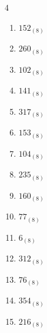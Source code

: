 \begin{multicols}{4}
\begin{enumerate}
        \phantom{$=206$}

  \item $152_{(8)}$

        \phantom{$=106$}

  \item $260_{(8)}$

        \phantom{$=176$}

  \item $102_{(8)}$

        \phantom{$=66$}

  \item $141_{(8)}$

        \phantom{$=97$}

  \item $317_{(8)}$

        \phantom{$=207$}

  \item $153_{(8)}$

        \phantom{$=107$}

  \item $104_{(8)}$

        \phantom{$=68$}

  \item $235_{(8)}$

        \phantom{$=157$}

  \item $160_{(8)}$

        \phantom{$=112$}

  \item $77_{(8)}$

        \phantom{$=63$}

  \item $6_{(8)}$

        \phantom{$=6$}

\columnbreak %

  \item $312_{(8)}$

        \phantom{$=202$}

  \item $76_{(8)}$

        \phantom{$=62$}

  \item $354_{(8)}$

        \phantom{$=236$}

  \item $216_{(8)}$

        \phantom{$=142$}


\end{enumerate}
\end{multicols}
